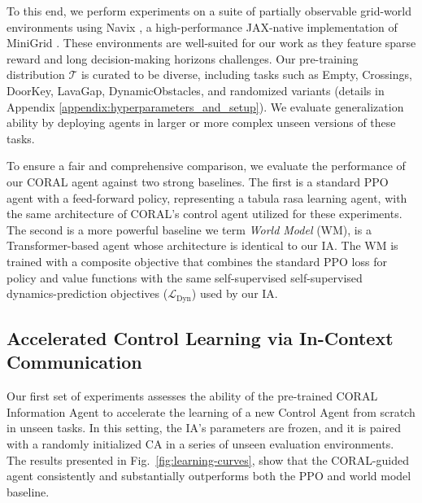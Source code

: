 \documentclass[letterpaper]{article} %
\begin{document}
To this end, we perform experiments on a suite of partially observable grid-world environments using Navix \cite{pignatelli2024navix}, a high-performance JAX-native implementation of MiniGrid \cite{chevalier2023minigrid}. These environments are well-suited for our work as they feature sparse reward and long decision-making horizons challenges. Our pre-training distribution $\mathcal{T}$ is curated to be diverse, including tasks such as Empty, Crossings, DoorKey, LavaGap, DynamicObstacles, and randomized variants (details in Appendix \ref{appendix:hyperparameters_and_setup}). We evaluate generalization ability by deploying agents in larger or more complex unseen versions of these tasks.

To ensure a fair and comprehensive comparison, we evaluate the performance of our CORAL agent against two strong baselines. The first is a standard PPO agent with a feed-forward policy, representing a tabula rasa learning agent, with the same architecture of CORAL's control agent utilized for these experiments. The second is a more powerful baseline we term \textit{World Model} (WM), is a Transformer-based agent whose architecture is identical to our IA. The WM is trained with a composite objective that combines the standard PPO loss for policy and value functions with the same self-supervised self-supervised dynamics-prediction objectives ($\mathcal{L}_{\text{Dyn}}$) used by our IA.

\subsection{Accelerated Control Learning via In-Context Communication}

Our first set of experiments assesses the ability of the pre-trained CORAL Information Agent to accelerate the learning of a new Control Agent from scratch in unseen tasks. In this setting, the IA's parameters are frozen, and it is paired with a randomly initialized CA in a series of unseen evaluation environments. The results presented in Fig.~\ref{fig:learning-curves}, show that the CORAL-guided agent consistently and substantially outperforms both the PPO and world model baseline. 
\end{document}
